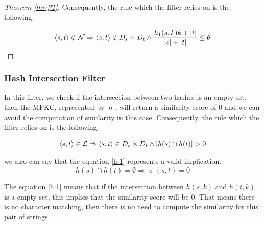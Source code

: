 \begin{proof}[Theorem \ref{thr:ff1}]



Consequently, the rule which the filter relies on is the following.

\begin{equation}
	\langle s,t \rangle \notin \mathcal{N} \Rightarrow \langle s,t \rangle \notin {\ensuremath{D_s}}{} \times {\ensuremath{D_t}}{} \wedge \frac{h_1(s,k) k + |t|}{|s|+|t|} \leq \theta 
\end{equation}
\end{proof}

\subsubsection{Hash Intersection Filter} \label{hashintfilter}
In this filter, we check if the intersection between two hashes is an empty set, then the MFKC, represented by $\upsigma$, will return a similarity score of 0 and we can avoid the computation of similarity in this case.
Consequently, the rule which the filter relies on is the following.

\begin{equation}
	\langle s,t \rangle \in \mathcal{L} \Rightarrow \langle s,t \rangle \in {\ensuremath{D_s}}{} \times {\ensuremath{D_t}}{} \wedge |h(s) \cap h(t)| > 0
\end{equation}

we also can say that the equation \ref{h:1} represents a valid implication.
\begin{equation} \label{h:1}
	h(s) \cap h(t) = \emptyset \Rightarrow \upsigma(s,t)=0
\end{equation}

The equation \ref{h:1} means that if the intersection between $h(s,k)$ and $h(t,k)$ is a empty set, this implies that the similarity score will be 0.
That means there is no character matching, then there is no need to compute the similarity for this pair of strings.

